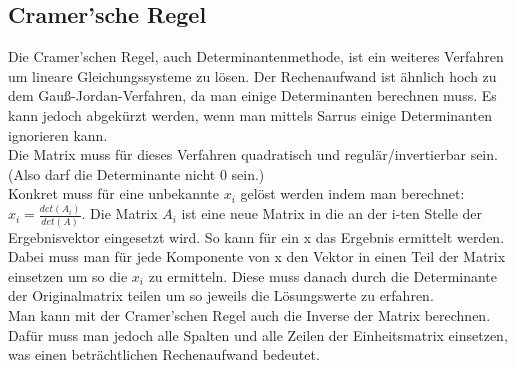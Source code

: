 \documentclass{article}
\begin{document}
	\subsection{Cramer'sche Regel}
	Die Cramer'schen Regel, auch Determinantenmethode, ist ein weiteres Verfahren um lineare Gleichungssysteme zu lösen. Der Rechenaufwand ist ähnlich hoch zu dem Gauß-Jordan-Verfahren, da man einige Determinanten berechnen muss. Es kann jedoch abgekürzt werden, wenn man mittels Sarrus einige Determinanten ignorieren kann. \\
	Die Matrix muss für dieses Verfahren quadratisch und regulär/invertierbar sein. (Also darf die Determinante nicht 0 sein.) \\
	Konkret muss für eine unbekannte $x_i$ gelöst werden indem man berechnet: $x_i=\frac{det(A_i)}{det(A)}$. Die Matrix $A_i$ ist eine neue Matrix in die an der i-ten Stelle der Ergebnisvektor eingesetzt wird. So kann für ein x das Ergebnis ermittelt werden. Dabei muss man für jede Komponente von x den Vektor in einen Teil der Matrix einsetzen um so die $x_i$ zu ermitteln. Diese muss danach durch die Determinante der Originalmatrix teilen um so jeweils die Lösungswerte zu erfahren. \\
	Man kann mit der Cramer'schen Regel auch die Inverse der Matrix berechnen. Dafür muss man jedoch alle Spalten und alle Zeilen der Einheitsmatrix einsetzen, was einen beträchtlichen Rechenaufwand bedeutet.
	
\end{document}

